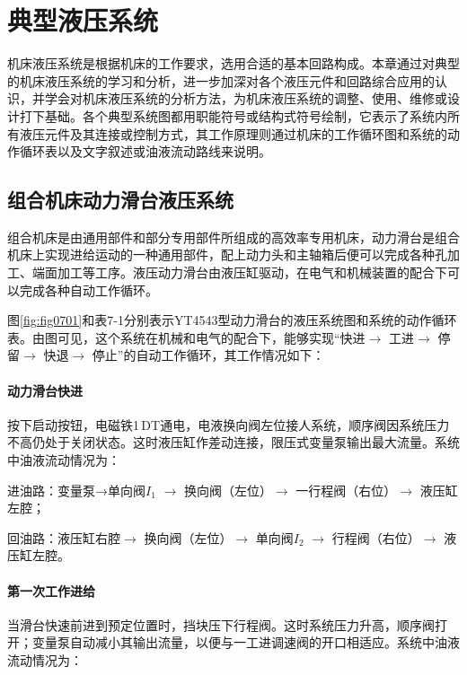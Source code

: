 
\chapter{典型液压系统}

机床液压系统是根据机床的工作要求，选用合适的基本回路构成。本章通过对典型的机床液压系统的学习和分析，进一步加深对各个液压元件和回路综合应用的认识，并学会对机床液压系统的分析方法，为机床液压系统的调整、使用、维修或设计打下基础。各个典型系统图都用职能符号或结构式符号绘制，它表示了系统内所有液压元件及其连接或控制方式，其工作原理则通过机床的工作循环图和系统的动作循环表以及文字叙述或油液流动路线来说明。

\section{组合机床动力滑台液压系统}

组合机床是由通用部件和部分专用部件所组成的高效率专用机床，动力滑台是组合机床上实现进给运动的一种通用部件，配上动力头和主轴箱后便可以完成各种孔加工、端面加工等工序。液压动力滑台由液压缸驱动，在电气和机械装置的配合下可以完成各种自动工作循环。

图\ref{fig:fig0701}和表7-1分别表示YT4543型动力滑台的液压系统图和系统的动作循环表。由图可见，这个系统在机械和电气的配合下，能够实现“快进$\rightarrow$ 工进$\rightarrow$ 停留$\rightarrow$ 快退$\rightarrow$ 停止”的自动工作循环，其工作情况如下：

\subsubsection {动力滑台快进}
按下启动按钮，电磁铁1\,DT通电，电液换向阀左位接人系统，顺序阀因系统压力不高仍处于关闭状态。这时液压缸作差动连接，限压式变量泵输出最大流量。系统中油液流动情况为： 

进油路：变量泵→单向阀$I_{1}$ $\rightarrow$ 换向阀（左位）$\rightarrow$ 一行程阀（右位）$\rightarrow$ 液压缸左腔；

回油路：液压缸右腔$\rightarrow$ 换向阀（左位）$\rightarrow$ 单向阀$I_{2}$ $\rightarrow$ 行程阀（右位）$\rightarrow$ 液压缸左腔。

\subsubsection {第一次工作进给}

当滑台快速前进到预定位置时，挡块压下行程阀。这时系统压力升高，顺序阀打开；变量泵自动减小其输出流量，以便与一工进调速阀的开口相适应。系统中油液流动情况为：

